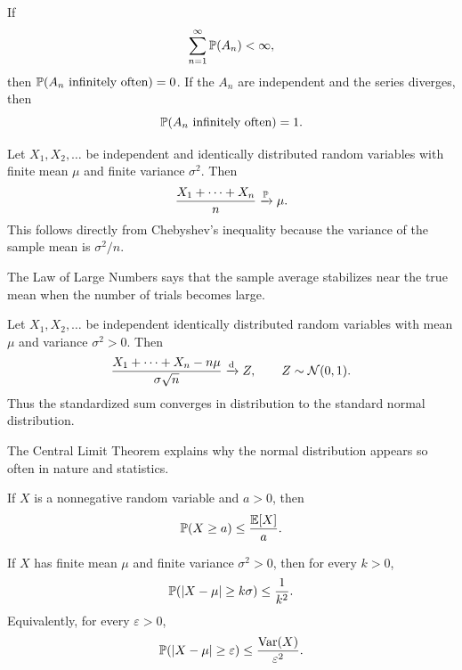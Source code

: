     \begin{theorem}
        If
        \[
            \sum_{n=1}^{\infty}\mathbb{P}(A_n)<\infty,
        \]
        then $\mathbb{P}(A_n\text{ infinitely often})=0$. If the $A_n$ are
        independent and the series diverges, then
        \[
            \mathbb{P}(A_n\text{ infinitely often})=1.
        \]
    \end{theorem}

    \begin{theorem}
        Let $X_1,X_2,\dots$ be independent and identically distributed random
        variables with finite mean $\mu$ and finite variance $\sigma^2$. Then
        \[
            \frac{X_1+\cdots+X_n}{n}
            \xrightarrow{\mathbb{P}}
            \mu.
        \]
        This follows directly from Chebyshev's inequality because the variance
        of the sample mean is $\sigma^2/n$.
    \end{theorem}

    \begin{idea}
        The Law of Large Numbers says that the sample average stabilizes near
        the true mean when the number of trials becomes large.
    \end{idea}

    \begin{theorem}
        Let $X_1,X_2,\dots$ be independent identically distributed random
        variables with mean $\mu$ and variance $\sigma^2>0$. Then
        \[
            \frac{X_1+\cdots+X_n-n\mu}{\sigma\sqrt n}
            \xrightarrow{\mathrm{d}}
            Z,
            \qquad
            Z\sim\mathcal{N}(0,1).
        \]
        Thus the standardized sum converges in distribution to the standard
        normal distribution.
    \end{theorem}

    \begin{remark}
        The Central Limit Theorem explains why the normal distribution appears
        so often in nature and statistics.
    \end{remark}

    \begin{theorem}
        If $X$ is a nonnegative random variable and $a>0$, then
        \[
            \mathbb{P}(X\geq a)
            \leq
            \frac{\mathbb{E}[X]}{a}.
        \]
    \end{theorem}

    \begin{theorem}
        If $X$ has finite mean $\mu$ and finite variance $\sigma^2>0$, then
        for every $k>0$,
        \[
            \mathbb{P}(|X-\mu|\geq k\sigma)
            \leq
            \frac{1}{k^2}.
        \]
        Equivalently, for every $\varepsilon>0$,
        \[
            \mathbb{P}(|X-\mu|\geq \varepsilon)
            \leq
            \frac{\operatorname{Var}(X)}{\varepsilon^2}.
        \]
    \end{theorem}

